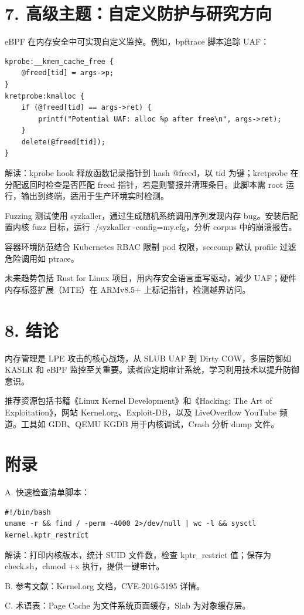 \chapter{7. 高级主题：自定义防护与研究方向}
eBPF 在内存安全中可实现自定义监控。例如，bpftrace 脚本追踪 UAF：\par
\begin{lstlisting}
kprobe:__kmem_cache_free {
    @freed[tid] = args->p;
}
kretprobe:kmalloc {
    if (@freed[tid] == args->ret) {
        printf("Potential UAF: alloc %p after free\n", args->ret);
    }
    delete(@freed[tid]);
}
\end{lstlisting}
解读：kprobe hook 释放函数记录指针到 hash @freed，以 tid 为键；kretprobe 在分配返回时检查是否匹配 freed 指针，若是则警报并清理条目。此脚本需 root 运行，输出到终端，适用于生产环境实时检测。\par
Fuzzing 测试使用 syzkaller，通过生成随机系统调用序列发现内存 bug。安装后配置内核 fuzz 目标，运行 ./syzkaller -config=my.cfg，分析 corpus 中的崩溃报告。\par
容器环境防范结合 Kubernetes RBAC 限制 pod 权限，seccomp 默认 profile 过滤危险调用如 ptrace。\par
未来趋势包括 Rust for Linux 项目，用内存安全语言重写驱动，减少 UAF；硬件内存标签扩展（MTE）在 ARMv8.5+ 上标记指针，检测越界访问。\par
\chapter{8. 结论}
内存管理是 LPE 攻击的核心战场，从 SLUB UAF 到 Dirty COW，多层防御如 KASLR 和 eBPF 监控至关重要。读者应定期审计系统，学习利用技术以提升防御意识。\par
推荐资源包括书籍《Linux Kernel Development》和《Hacking: The Art of Exploitation》，网站 Kernel.org、Exploit-DB，以及 LiveOverflow YouTube 频道。工具如 GDB、QEMU KGDB 用于内核调试，Crash 分析 dump 文件。\par
\chapter{附录}
A. 快速检查清单脚本：\par
\begin{lstlisting}
#!/bin/bash
uname -r && find / -perm -4000 2>/dev/null | wc -l && sysctl kernel.kptr_restrict
\end{lstlisting}
解读：打印内核版本，统计 SUID 文件数，检查 kptr\_{}restrict 值；保存为 check.sh，chmod +x 执行，提供一键审计。\par
B. 参考文献：Kernel.org 文档，CVE-2016-5195 详情。\par
C. 术语表：Page Cache 为文件系统页面缓存，Slab 为对象缓存层。\par
